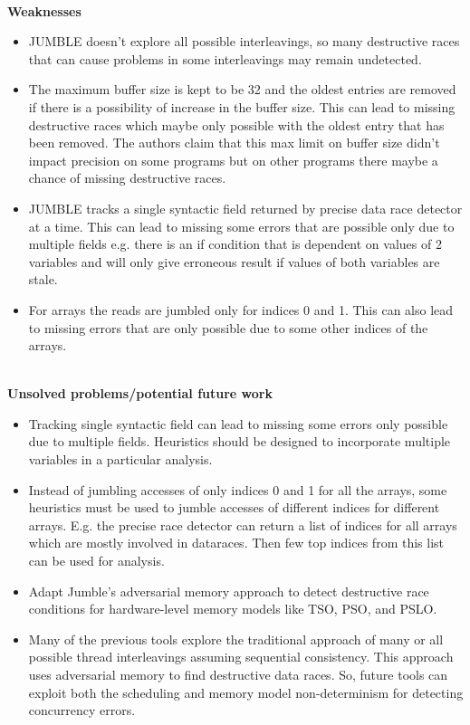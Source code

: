 \documentclass[20pt]{letter}
\begin{document}
\begin{enumerate}
{\textbf{\\Weaknesses}\\
\begin{itemize}
    \item JUMBLE doesn't explore all possible interleavings, so many destructive races that can cause problems in some interleavings may remain undetected. 
    \item The maximum buffer size is kept to be 32 and the oldest entries are removed if there is a possibility of increase in the buffer size. This can lead to missing destructive races which maybe only possible with the oldest entry that has been removed. The authors claim that this max limit on buffer size didn't impact precision on some programs but on other programs there maybe a chance of missing destructive races.
    \item JUMBLE tracks a single syntactic field returned by precise data race detector at a time. This can lead to missing some errors that are possible only due to multiple fields e.g. there is an if condition that is dependent on values of 2 variables and will only give erroneous result if values of both variables are stale.
    \item For arrays the reads are jumbled only for indices 0 and 1. This can also lead to missing errors that are only possible due to some other indices of the arrays.
\end{itemize}

\textbf{\\Unsolved problems/potential future work}\\
\begin{itemize}
    \item Tracking single syntactic field can lead to missing some errors only possible due to multiple fields. Heuristics should be designed to incorporate multiple variables in a particular analysis. 
    \item Instead of jumbling accesses of only indices 0 and 1 for all the arrays, some heuristics must be used to jumble accesses of different indices for different arrays. E.g. the precise race detector can return a list of indices for all arrays which are mostly involved in dataraces. Then few top indices from this list can be used for analysis.
    \item Adapt Jumble's adversarial memory approach to detect destructive race conditions for hardware-level memory models like TSO, PSO, and PSLO.
    \item Many of the previous tools explore the traditional approach of many or all possible thread interleavings assuming sequential consistency. This approach uses adversarial memory to find destructive data races. So, future tools can exploit both the scheduling and memory model non-determinism for detecting concurrency errors.
\end{itemize}
}


\end{enumerate}
\end{document}
